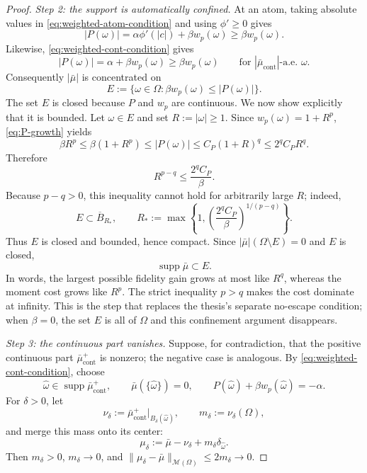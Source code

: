 \documentclass[11pt]{amsart}
\theoremstyle{definition}
\theoremstyle{remark}
\DeclareMathOperator{\supp}{supp}
\DeclareMathOperator{\cont}{cont}
\newcommand{\M}{\mathcal{M}}
\begin{document}
\begin{proof}
\medskip
\noindent
\emph{Step 2: the support is automatically confined.}
At an atom, taking absolute values in
\eqref{eq:weighted-atom-condition} and using $\phi'\geq0$ gives
\[
  |P(\omega)|
  =\alpha\phi'(|c|)+\beta w_p(\omega)
  \geq \beta w_p(\omega).
\]
Likewise, \eqref{eq:weighted-cont-condition} gives
\[
  |P(\omega)|
  =\alpha+\beta w_p(\omega)
  \geq\beta w_p(\omega)
  \qquad\text{for }|\bar\mu_{\cont}|\text{-a.e. }\omega.
\]
Consequently $|\bar\mu|$ is concentrated on
\[
  E
  :=
  \{\omega\in\Omega:\beta w_p(\omega)\leq|P(\omega)|\}.
\]
The set $E$ is closed because $P$ and $w_p$ are continuous.  We now show
explicitly that it is bounded.  Let $\omega\in E$ and set $R:=|\omega|\geq1$.
Since $w_p(\omega)=1+R^p$, \eqref{eq:P-growth} yields
\[
  \beta R^p
  \leq \beta(1+R^p)
  \leq |P(\omega)|
  \leq C_P(1+R)^q
  \leq 2^q C_P R^q.
\]
Therefore
\[
  R^{p-q}\leq \frac{2^q C_P}{\beta}.
\]
Because $p-q>0$, this inequality cannot hold for arbitrarily large $R$;
indeed,
\[
  E\subset \overline B_{R_*},
  \qquad
  R_*:=\max\left\{1,
  \left(\frac{2^qC_P}{\beta}\right)^{1/(p-q)}\right\}.
\]
Thus $E$ is closed and bounded, hence compact.  Since
$|\bar\mu|(\Omega\setminus E)=0$ and $E$ is closed,
\[
  \supp\bar\mu\subset E.
\]
In words, the largest possible fidelity gain grows at most like $R^q$, whereas
the moment cost grows like $R^p$.  The strict inequality $p>q$ makes the cost
dominate at infinity.  This is the step that replaces the thesis's separate
no-escape condition; when $\beta=0$, the set $E$ is all of $\Omega$ and this
confinement argument disappears.

\medskip
\noindent
\emph{Step 3: the continuous part vanishes.}
Suppose, for contradiction, that the positive continuous part
$\bar\mu_{\cont}^+$ is nonzero; the negative case is analogous.  By
\eqref{eq:weighted-cont-condition}, choose
\[
  \widehat\omega\in\supp\bar\mu_{\cont}^+,
  \qquad
  \bar\mu(\{\widehat\omega\})=0,
  \qquad
  P(\widehat\omega)+\beta w_p(\widehat\omega)=-\alpha.
\]
For $\delta>0$, let
\[
  \nu_\delta
  :=
  \bar\mu_{\cont}^+|_{B_\delta(\widehat\omega)},
  \qquad
  m_\delta:=\nu_\delta(\Omega),
\]
and merge this mass onto its center:
\[
  \mu_\delta
  :=
  \bar\mu-\nu_\delta+m_\delta\delta_{\widehat\omega}.
\]
Then $m_\delta>0$, $m_\delta\to0$, and
$\|\mu_\delta-\bar\mu\|_{\M(\Omega)}\leq2m_\delta\to0$.


\end{proof}
\end{document}
